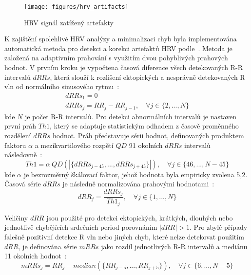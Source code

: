 \begin{figure}[h]
    \begin{center}
        \texttt{[image: figures/hrv\_artifacts]}
        \caption{HRV signál zatížený artefakty}
        \label{fig:hrv_artifacts}
    \end{center}
\end{figure}

K zajištění spolehlivé HRV analýzy a minimalizaci chyb byla implementována
automatická metoda pro detekci a korekci artefaktů HRV
podle~\cite{Lipponen2019}. Metoda je založená na adaptivním prahování s využitím
dvou pohyblivých prahových hodnot. V prvním kroku je vypočtena časová diference
všech detekovaných R-R intervalů $dRRs$, která slouží k rozlišení ektopických a
nesprávně detekovaných R vln od normálního sinusového rytmu~\cite{Lipponen2019}:
\begin{gather}
    dRRs_1 = 0 \nonumber \\
    dRRs_j = RR_j - RR_{j-1}, \quad \forall j \in \{2,...,N\}
\end{gather}
kde $N$ je počet R-R intervalů. Pro detekci abnormálních intervalů je nastaven
první práh $Th1$, který se adaptuje statistickým odhadem z časově proměnného
rozdělení $dRRs$ hodnot. Práh představuje sérii hodnot, definovaných produktem
faktoru $\alpha$ a mezikvartilového rozpětí $QD$ 91 okolních $dRRs$ intervalů
následovně~\cite{Lipponen2019}:
\begin{equation}
    Th1 = \alpha~QD(|\{dRRs_{j-45},...,dRRs_{j+45}\}|), \quad \forall j \in \{46,...,N-45\}
\end{equation}
kde $\alpha$ je bezrozměrný škálovací faktor, jehož hodnota byla empiricky zvolena
5,2. Časová série $dRRs$ je následně normalizována prahovými
hodnotami~\cite{Lipponen2019}:
\begin{equation}
    dRR_j = \frac{dRRs_j}{Th1_j}, \quad \forall j \in \{1,...,N\}
\end{equation}

Veličiny $dRR$ jsou použité pro detekci ektopických, krátkých, dlouhých nebo
jednotlivě chybějících srdečních period porovnáním $|dRR|>1$. Pro zbylé případy
falešně pozitivní detekce R vln nebo jiných chyb, které nelze detekovat použitím
$dRR$, je definována série $mRRs$ jako rozdíl jednotlivých R-R intervalů a
mediánu 11 okolních hodnot~\cite{Lipponen2019}:
\begin{equation}
    mRRs_j = RR_j - median(\{RR_{j-5},...,RR_{j+5}\}), \quad \forall j \in \{6,...,N-5\}
\end{equation}

